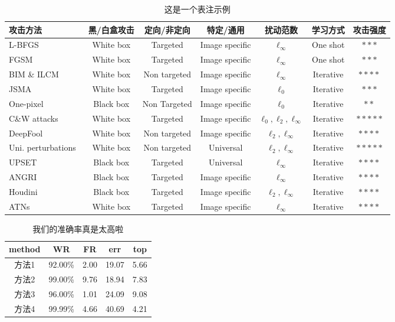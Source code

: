 \documentclass[zihao=-4]{ctexart}
\begin{document}
\begin{spacing}{1.5}
\begin{table*}[t]
\centering
\caption{这是一个表注示例}
\begin{tabular}{|l||c|c|c|c|c|c|}
\hline
 {\textbf{攻击方法}}							&  黑/白盒攻击	&  定向/非定向 	& 特定/通用 	& 扰动范数 & 学习方式 		& 攻击强度  \\ \hline\hline
L-BFGS~ 		&  White box		&  Targeted					& Image specific			& $\ell_{\infty}$ 	& One shot		& $***$	\\ \hline
FGSM~		&  White box		&  Targeted					& Image specific			& $\ell_{\infty}$	& One shot		& $***$ \\ \hline
BIM \& ILCM~&  White box		& Non targeted				& Image specific			& $\ell_{\infty}$	& Iterative		& $**$$**$ 	\\ \hline
JSMA~		&  White box		& Targeted					& Image specific			& $\ell_{0}$	& Iterative			& $***$ 	\\ \hline
One-pixel~	& Black box		& Non Targeted		& Image specific		& $\ell_0$		& Iterative	& $**$ \\ \hline
C\&W attacks~ & White box	& Targeted	&	Image specific		&	$\ell_0, \ell_2, \ell_{\infty}$	&	Iterative & $*****$ \\ \hline
DeepFool~ & White box	& Non targeted		& Image specific		& $\ell_2, \ell_{\infty}$	& Iterative	& $**$$**$ \\ \hline
Uni. perturbations~ & White box	& Non targeted & Universal &	$\ell_2, \ell_{\infty}$ & Iterative & $*****$ \\ \hline
UPSET~ & Black box	& Targeted		& Universal 	&  $\ell_{\infty}$ & Iterative & $**$$**$ \\ \hline
ANGRI~ & Black box	& Targeted		& Image specific	& $\ell_{\infty}$ &	Iterative & $**$$**$ \\ \hline
Houdini~ & Black box		& Targeted		& Image specific	& $\ell_2, \ell_{\infty}$ & Iterative & $**$$**$ \\ \hline
ATNs~ & White box			& Targeted		& Image specific	& $\ell_{\infty}$ & Iterative & $**$$**$ \\ \hline
\end{tabular}
\end{table*}

\begin{table}[H]
\caption{我们的准确率真是太高啦}
\centering
\begin{tabular}{ccccc}
\hline  
\textbf{method} & \textbf{WR} & \textbf{FR} & \textbf{err} & \textbf{top} \\ 
\hline  
方法1 & 92.00\% & 2.00 & 19.07  & 5.66\\
方法2 & 99.00\%   & 9.76  & 18.94 & 7.83\\
方法3 & 96.00\%   & 1.01  & 24.09  & 9.08\\
方法4 & 99.99\%   & 4.66  & 40.69 & 4.21\\
\hline
\end{tabular} 
\end{table} 


\end{spacing}
\end{document}
